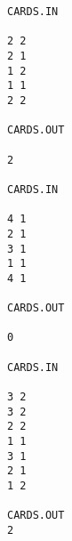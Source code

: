 \begin{verbatim}
CARDS.IN

2 2
2 1
1 2
1 1
2 2

CARDS.OUT

2
 
CARDS.IN

4 1
2 1
3 1
1 1
4 1

CARDS.OUT

0
 
CARDS.IN

3 2
3 2
2 2
1 1
3 1
2 1
1 2

CARDS.OUT
2
\end{verbatim}